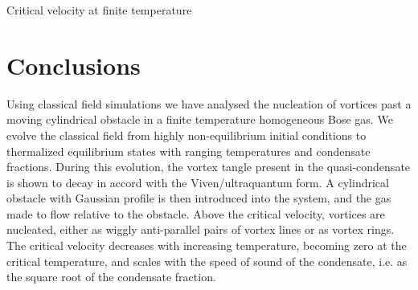 \begin{chapter}{\label{cha:nonequib}Critical velocity at finite temperature}
\section{Conclusions\label{sec:conclusions}}
Using classical field simulations we have analysed the nucleation of vortices past a moving cylindrical obstacle in a finite temperature homogeneous Bose gas. We evolve the classical field from highly non-equilibrium initial conditions to thermalized equilibrium states with ranging temperatures and condensate fractions.  During this evolution, the vortex tangle present in the quasi-condensate is shown to decay in accord with the Viven/ultraquantum form.  A cylindrical obstacle with Gaussian profile is then introduced into the system, and the gas made to flow relative to the obstacle.  Above the critical velocity, vortices are nucleated, either as wiggly anti-parallel pairs of vortex lines or as vortex rings. The critical velocity decreases with increasing temperature, becoming zero at the critical temperature, and scales with the speed of sound of the condensate, i.e. as the square root of the condensate fraction.  
\end{chapter}
